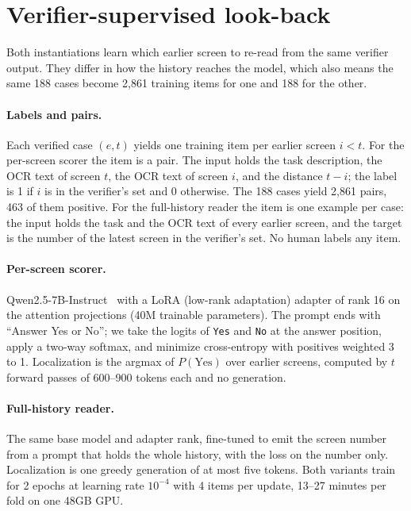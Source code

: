 \section{Verifier-supervised look-back}
\label{sec:method}
Both instantiations learn which earlier screen to re-read from the same verifier output. They differ in how the history reaches the model, which also means the same 188 cases become 2,861 training items for one and 188 for the other.

\paragraph{Labels and pairs.} Each verified case $(e,t)$ yields one training item per earlier screen $i<t$. For the per-screen scorer the item is a pair. The input holds the task description, the OCR text of screen $t$, the OCR text of screen $i$, and the distance $t-i$; the label is 1 if $i$ is in the verifier's set and 0 otherwise. The 188 cases yield 2,861 pairs, 463 of them positive. For the full-history reader the item is one example per case: the input holds the task and the OCR text of every earlier screen, and the target is the number of the latest screen in the verifier's set. No human labels any item.

\paragraph{Per-screen scorer.} Qwen2.5-7B-Instruct~\citep{qwen25} with a LoRA (low-rank adaptation) adapter of rank 16 on the attention projections (40M trainable parameters). The prompt ends with ``Answer Yes or No''; we take the logits of \texttt{Yes} and \texttt{No} at the answer position, apply a two-way softmax, and minimize cross-entropy with positives weighted 3 to 1. Localization is the argmax of $P(\text{Yes})$ over earlier screens, computed by $t$ forward passes of 600--900 tokens each and no generation.

\paragraph{Full-history reader.} The same base model and adapter rank, fine-tuned to emit the screen number from a prompt that holds the whole history, with the loss on the number only. Localization is one greedy generation of at most five tokens. Both variants train for 2 epochs at learning rate $10^{-4}$ with 4 items per update, 13--27 minutes per fold on one 48GB GPU.

